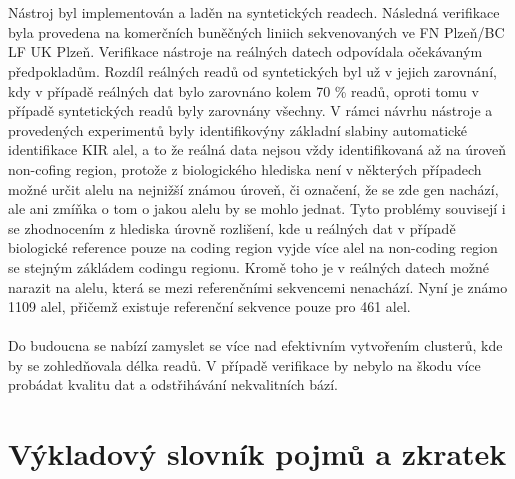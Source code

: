 \documentclass[czech,DP]{thesiskiv}
\numberwithin{equation}{section}
\begin{document}
\\
\\
Nástroj byl implementován a laděn na syntetických readech. Následná verifikace byla provedena na komerčních buněčných liniich sekvenovaných ve FN Plzeň/BC LF UK Plzeň. Verifikace nástroje na reálných datech odpovídala očekávaným předpokladům. Rozdíl reálných readů od syntetických byl už v jejich zarovnání, kdy v případě reálných dat bylo zarovnáno kolem 70 \% readů, oproti tomu v případě syntetických readů byly zarovnány všechny. V rámci návrhu nástroje a provedených experimentů byly identifikovýny základní slabiny automatické identifikace KIR alel, a to že reálná data nejsou vždy identifikovaná až na úroveň non-cofing region, protože z biologického hlediska není v některých případech možné určit alelu na nejnižší známou úroveň, či označení, že se zde gen nachází, ale ani zmíňka o tom o jakou alelu by se mohlo jednat. Tyto problémy souvisejí i se zhodnocením z hlediska úrovně rozlišení, kde u reálných dat v případě biologické reference pouze na coding region vyjde více alel na non-coding region se stejným zákládem codingu regionu. Kromě toho je v reálných datech možné narazit na alelu, která se mezi referenčními sekvencemi nenachází. Nyní je známo 1109 alel, přičemž existuje referenční sekvence pouze pro 461 alel.
\\
\\
Do budoucna se nabízí zamyslet se více nad efektivním vytvořením clusterů, kde by se zohledňovala délka readů. V případě verifikace by nebylo na škodu více probádat kvalitu dat a odstřihávání nekvalitních bází. 


\chapter{Výkladový slovník pojmů a zkratek}
\end{document}

